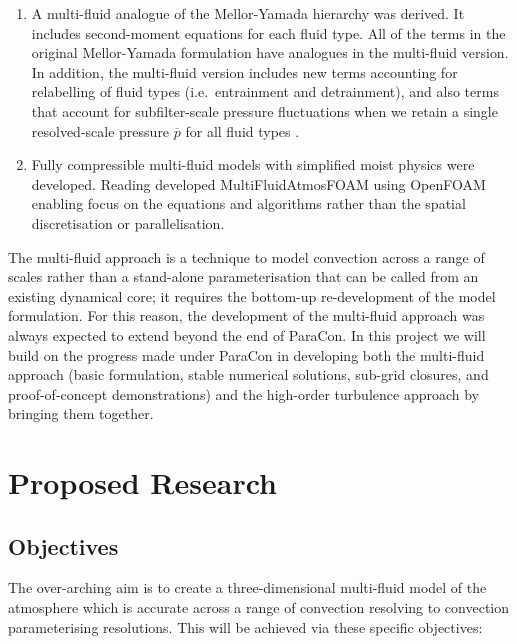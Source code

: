 \documentclass[11pt,a4paper]{article}
\begin{document}
\begin{enumerate}
\item A multi-fluid analogue of the Mellor-Yamada hierarchy was derived. It includes second-moment equations for each fluid type. All of the terms in the original Mellor-Yamada formulation have analogues in the multi-fluid version. In addition, the multi-fluid version includes new terms accounting for relabelling of fluid types (i.e.\ entrainment and detrainment), and also terms that account for subfilter-scale pressure fluctuations when we retain a single resolved-scale pressure $\overline{p}$ for all fluid types \citep{TWV+18}.

\item Fully compressible multi-fluid models with simplified moist physics were developed. Reading developed MultiFluidAtmosFOAM using OpenFOAM enabling focus on the equations and algorithms rather than the spatial discretisation or parallelisation.

\end{enumerate}

The multi-fluid approach is a technique to model convection across a range of scales rather than a stand-alone parameterisation that can be called from an existing dynamical core; it requires the bottom-up re-development of the model formulation. For this reason, the development of the multi-fluid approach was always expected to extend beyond the end of ParaCon. In this project we will build on the progress made under ParaCon in developing both the multi-fluid approach (basic formulation, stable numerical solutions, sub-grid closures, and proof-of-concept demonstrations) and the high-order turbulence approach by bringing them together.

\section{Proposed Research}

\subsection{Objectives}

The over-arching aim is to create a three-dimensional multi-fluid model of the atmosphere which is accurate across a range of convection resolving to convection parameterising resolutions. This will be achieved via these specific objectives:
\end{document}
